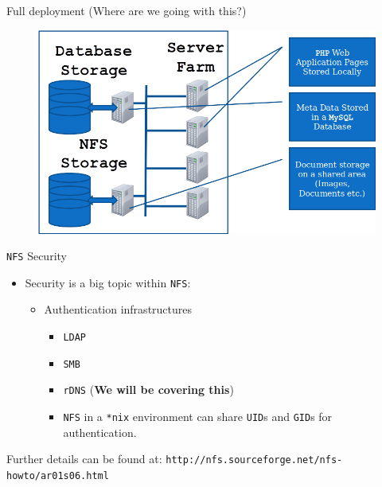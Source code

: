 \documentclass[xcolor=table,aspectratio=169]{beamer}
\begin{document}
\begin{frame}{Full deployment (Where are we going with this?)}
  \begin{figure}
    \begin{center}
      \includegraphics[width=0.7\linewidth]{FullDeployment.png}
    \end{center}
  \end{figure}
\end{frame}

\begin{frame}{\texttt{NFS} Security}
  \begin{itemize}
    \item Security is a big topic within \texttt{NFS}:
      \begin{itemize}
        \item Authentication infrastructures  
          \begin{itemize}
            \item \texttt{LDAP}
            \item \texttt{SMB}
            \item \texttt{rDNS} (\textbf{We will be covering this})
            \item \texttt{NFS} in a \texttt{*nix} environment can share \texttt{UID}s and \texttt{GID}s for authentication.
          \end{itemize}
      \end{itemize}
  \end{itemize}
  \begin{tcolorbox}
    \begin{center}
      \scriptsize Further details can be found at: \texttt{http://nfs.sourceforge.net/nfs-howto/ar01s06.html}
    \end{center}
  \end{tcolorbox}
\end{frame}
\end{document}
